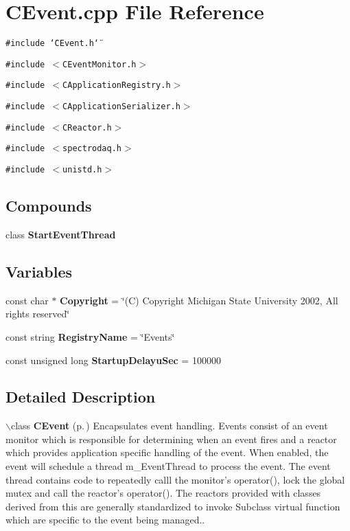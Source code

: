 \section{CEvent.cpp File Reference}
\label{CEvent_8cpp}
{\tt \#include \char`\"{}CEvent.h\char`\"{}}\par
{\tt \#include $<$CEvent\-Monitor.h$>$}\par
{\tt \#include $<$CApplication\-Registry.h$>$}\par
{\tt \#include $<$CApplication\-Serializer.h$>$}\par
{\tt \#include $<$CReactor.h$>$}\par
{\tt \#include $<$spectrodaq.h$>$}\par
{\tt \#include $<$unistd.h$>$}\par
\subsection*{Compounds}
\begin{CompactItemize}
\item 
class {\bf Start\-Event\-Thread}
\end{CompactItemize}
\subsection*{Variables}
\begin{CompactItemize}
\item 
const char $\ast$ {\bf Copyright} = \char`\"{}(C) Copyright Michigan State University 2002, All rights reserved\char`\"{}
\item 
const string {\bf Registry\-Name} = \char`\"{}Events\char`\"{}
\item 
const unsigned long {\bf Startup\-Delayu\-Sec} = 100000
\end{CompactItemize}


\subsection{Detailed Description}


$\backslash$class {\bf CEvent} {\rm (p.\,\pageref{classCEvent})}  Encapsulates event handling. Events consist of an event monitor which is responsible for determining when an event fires and a reactor which provides application specific handling of the event.  When enabled, the event will schedule a thread m\_\-Event\-Thread to process the event. The event thread contains code to repeatedly calll the monitor's operator(), lock the global mutex and call the reactor's operator(). The reactors provided with  classes derived from this are generally standardized to invoke Subclass virtual function which are specific to the event being managed..



